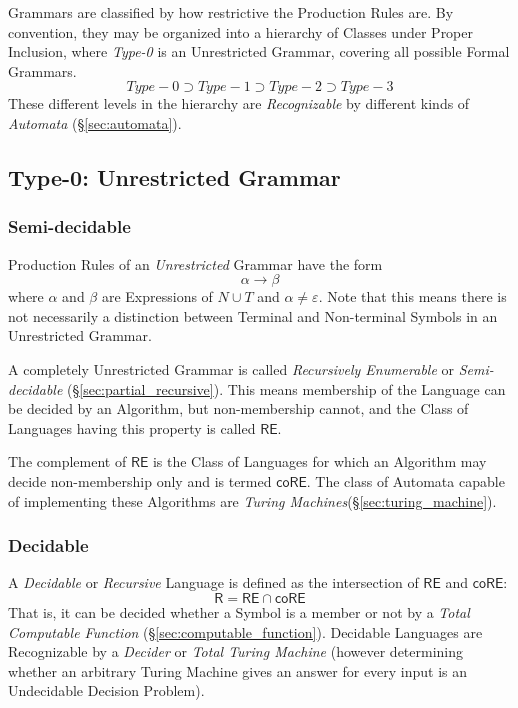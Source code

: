 Grammars are classified by how restrictive the Production Rules are.
By convention, they may be organized into a hierarchy of Classes under
Proper Inclusion, where \emph{Type-0} is an Unrestricted Grammar,
covering all possible Formal Grammars.
\[
    Type-0 \supset Type-1 \supset Type-2 \supset Type-3
\]
These different levels in the hierarchy are \emph{Recognizable} by
different kinds of \emph{Automata} (\S\ref{sec:automata}).



\subsection{Type-0: Unrestricted Grammar}\label{sec:unrestricted_grammar}

\subsubsection{Semi-decidable}\label{sec:semidecidable}

Production Rules of an \emph{Unrestricted} Grammar have the form
\[
    \alpha \rightarrow \beta
\]
where $\alpha$ and $\beta$ are Expressions of $N \cup T$ and $\alpha
\neq \varepsilon$. Note that this means there is not necessarily a
distinction between Terminal and Non-terminal Symbols in an
Unrestricted Grammar.

A completely Unrestricted Grammar is called \emph{Recursively
  Enumerable} or \emph{Semi-decidable}
(\S\ref{sec:partial_recursive}). This means membership of the
Language can be decided by an Algorithm, but non-membership cannot,
and the Class of Languages having this property is called
$\mathsf{RE}$.

The complement of $\mathsf{RE}$ is the Class of Languages for which an
Algorithm may decide non-membership only and is termed
$\mathsf{coRE}$. The class of Automata capable of implementing these
Algorithms are \emph{Turing Machines}(\S\ref{sec:turing_machine}).



\subsubsection{Decidable}\label{sec:decidable_language}

A \emph{Decidable} or \emph{Recursive} Language is defined as the
intersection of $\mathsf{RE}$ and $\mathsf{coRE}$:
\[
    \mathsf{R} = \mathsf{RE} \cap \mathsf{coRE}
\]
That is, it can be decided whether a Symbol is a member or not by a
\emph{Total Computable Function} (\S\ref{sec:computable_function}).
Decidable Languages are Recognizable by a \emph{Decider} or
\emph{Total Turing Machine}\cite{kozen97} (however determining whether
an arbitrary Turing Machine gives an answer for every input is an
Undecidable Decision Problem).



